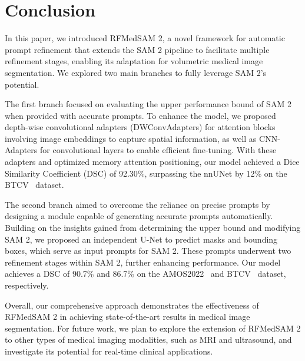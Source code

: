

\section{Conclusion}
\label{sec:conclusion}

In this paper, we introduced RFMedSAM 2, a novel framework for automatic prompt refinement that extends the SAM 2 pipeline to facilitate multiple refinement stages, enabling its adaptation for volumetric medical image segmentation. We explored two main branches to fully leverage SAM 2's potential. 

The first branch focused on evaluating the upper performance bound of SAM 2 when provided with accurate prompts. To enhance the model, we proposed depth-wise convolutional adapters (DWConvAdapters) for attention blocks involving image embeddings to capture spatial information, as well as CNN-Adapters for convolutional layers to enable efficient fine-tuning. With these adapters and optimized memory attention positioning, our model achieved a Dice Similarity Coefficient (DSC) of 92.30\%, surpassing the nnUNet by 12\% on the BTCV~\cite{landman2015miccai} dataset.

The second branch aimed to overcome the reliance on precise prompts by designing a module capable of generating accurate prompts automatically. Building on the insights gained from determining the upper bound and modifying SAM 2, we proposed an independent U-Net to predict masks and bounding boxes, which serve as input prompts for SAM 2. These prompts underwent two refinement stages within SAM 2, further enhancing performance. Our model achieves a DSC of 90.7\% and 86.7\% on the AMOS2022~\cite{ji2022amos} and BTCV~\cite{landman2015miccai} dataset, respectively.

Overall, our comprehensive approach demonstrates the effectiveness of RFMedSAM 2 in achieving state-of-the-art results in medical image segmentation.
For future work, we plan to explore the extension of RFMedSAM 2 to other types of medical imaging modalities, such as MRI and ultrasound, and investigate its potential for real-time clinical applications. 




